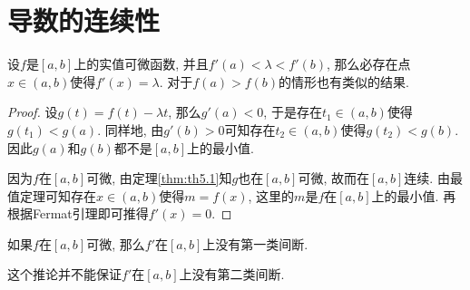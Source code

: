 \documentclass[cn,12pt,math=mtpro2,citestyle=gb7714-2015,bibstyle=gb7714-2015,twocol]{elegantbook}
\begin{document}
\section{导数的连续性}
\begin{theorem}[Darboux定理]
设$f$是$[a,b]$上的实值可微函数, 并且$f'(a)<\lambda<f'(b)$,  那么必存在点$x\in (a,b)$使得$f'(x)=\lambda$. 对于$f(a)>f(b)$的情形也有类似的结果.
\end{theorem}
\begin{proof}
  设$g(t)=f(t)-\lambda t$, 那么$g'(a)<0$, 于是存在$t_1\in (a,b)$使得$g(t_1)<g(a)$. 同样地, 由$g'(b)>0$可知存在$t_2\in(a,b)$使得$g(t_2)<g(b)$. 因此$g(a)$和$g(b)$都不是$[a,b]$上的最小值.

  因为$f$在$[a,b]$可微, 由定理\ref{thm:th5.1}知$g$也在$[a,b]$可微, 故而在$[a,b]$连续. 由最值定理可知存在$x\in (a,b)$使得$m=f(x)$, 这里的$m$是$f$在$[a,b]$上的最小值. 再根据Fermat引理即可推得$f'(x)=0$.

\end{proof}
\begin{corollary}
如果$f$在$[a,b]$可微, 那么$f'$在$[a,b]$上没有第一类间断.
\end{corollary}
\begin{remark}
这个推论并不能保证$f'$在$[a,b]$上没有第二类间断.
\end{remark}
\end{document}
